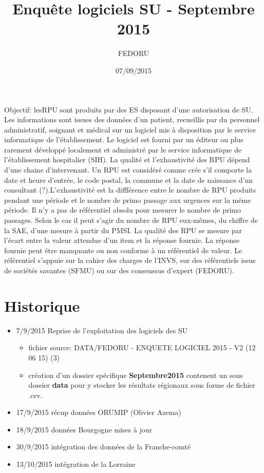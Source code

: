 \documentclass[]{article}
\title{Enquête logiciels SU - Septembre 2015}
\author{FEDORU}
\date{07/09/2015}
\providecommand{\tightlist}{%
  \setlength{\itemsep}{0pt}\setlength{\parskip}{0pt}}
\begin{document}
\maketitle

{
\hypersetup{linkcolor=black}
\setcounter{tocdepth}{2}
\tableofcontents
}
Objectif: lesRPU sont produits par des ES disposant d'une autorisation
de SU. Les informations sont issues des données d'un patient, recueillis
par du personnel administratif, soignant et médical sur un logiciel mis
à disposition par le service informatique de l'établissement. Le
logiciel est fourni par un éditeur ou plus rarement développé localement
et administré par le service informatique de l'établissement hospitalier
(SIH). La qualité et l'exhaustivité des RPU dépend d'une chaine
d'intervenant. Un RPU est considéré comme crée s'il comporte la date et
heure d'entrée, le code postal, la commune et la date de naissance d'un
consultant (?).L'exhaustivité est la diffférence entre le nombre de RPU
produits pendant une période et le nombre de primo passage aux urgences
sur la même période. Il n'y a pas de référentiel absolu pour mesurer le
nombre de primo passages. Selon le cas il peut s'agir du nombre de RPU
eux-mêmes, du chiffre de la SAE, d'une mesure à partir du PMSI. La
qualité des RPU se mesure par l'écart entre la valeur attendue d'un item
et la réponse fournie. La réponse fournie peut être manquante ou non
conforme à un référentiel de valeur. Le référentiel s'appuie sur la
cahier des charges de l'INVS, sur des référentiels issus de sociétés
savantes (SFMU) ou sur des consenssus d'expert (FEDORU).

\section{Historique}\label{historique}

\begin{itemize}
\item
  7/9/2015 Reprise de l'exploitation des logiciels des SU

  \begin{itemize}
  \tightlist
  \item
    fichier source: DATA/FEDORU - ENQUETE LOGICIEL 2015 - V2 (12 06 15)
    (3)
  \item
    création d'un dossier spécifique \textbf{Septembre2015} contenent un
    sous dossier \textbf{data} pour y stocker les résultats régionaux
    sous forme de fichier .csv.
  \end{itemize}
\item
  17/9/2015 récup données ORUMIP (Olivier Azema)
\item
  18/9/2015 données Bourgogne mises à jour
\item
  30/9/2015 intégration des données de la Franche-comté
\item
  13/10/2015 intégration de la Lorraine
\end{itemize}
\end{document}
